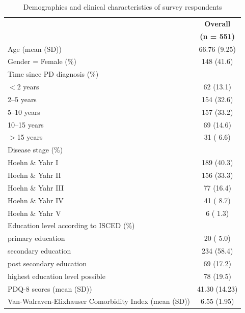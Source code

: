 \documentclass[a4paper,oneside,11pt,english]{scrartcl}
\begin{document}
\begin{table}[h!]
	\caption{Demographics and clinical characteristics of survey respondents}
	\label{table1}
	\begin{tabular}{p{10cm} c}
		\toprule
		&\textbf{Overall}\\ %
		& \textbf{(n = 551)}\\ \hline
		
		Age (mean (SD)) & 66.76 (9.25) \\ \hline
		Gender = Female (\%) &  148 (41.6)  \\ \hline
		Time since PD diagnosis (\%) & \\ \hline
		\hspace{3mm} $<$2 years & 62 (13.1) \\ \hline
		\hspace{3mm} 2--5 years & 154 (32.6) \\ \hline
		\hspace{3mm} 5--10 years & 157 (33.2) \\ \hline
		\hspace{3mm} 10--15 years & 69 (14.6) \\ \hline
		\hspace{3mm} $>$15 years& 31 ( 6.6) \\ \hline
		Disease stage (\%)& \\ \hline
		\hspace{3mm} Hoehn \& Yahr I &  189 (40.3) \\ \hline
		\hspace{3mm} Hoehn \& Yahr II & 156 (33.3)  \\ \hline
		\hspace{3mm} Hoehn \& Yahr III  &   77 (16.4) \\ \hline
		\hspace{3mm} Hoehn \& Yahr IV  & 41 ( 8.7) \\ \hline
		\hspace{3mm} Hoehn \& Yahr V  &     6 ( 1.3) \\ \hline
		Education level according to ISCED (\%) & \\ \hline
		\hspace{3mm} primary education  & 20 ( 5.0) \\ \hline
		\hspace{3mm} secondary education  & 234 (58.4)\\ \hline
		\hspace{3mm} post secondary education  &   69 (17.2) \\ \hline
		\hspace{3mm} highest education level possible & 78 (19.5)  \\ \hline
		\hspace{3mm} \textsc{PD}Q-8 scores (mean (SD)) & 41.30 (14.23) \\ \hline
		Van-Walraven-Elixhauser Comorbidity Index (mean (SD)) & 6.55 (1.95) \\ \hline
		\bottomrule
	\end{tabular}
\end{table}
\end{document}
